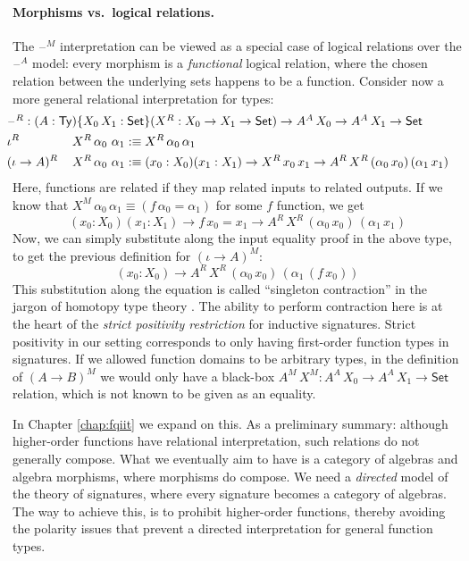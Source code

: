 \documentclass[12pt,a4paper,twoside,openany]{book}
\theoremstyle{remark}
\theoremstyle{definition}
\theoremstyle{theorem}
\newcommand{\Ty}{\mathsf{Ty}}
\newcommand{\blank}{\mathord{\hspace{1pt}\text{--}\hspace{1pt}}}
\newcommand{\Set}{\mathsf{Set}}
\newcommand{\defn}{:\equiv}
\begin{document}
\paragraph{Morphisms vs.\ logical relations.}
The $\blank^M$ interpretation can be viewed as a special case of logical
relations over the $\blank^A$ model: every morphism is a \emph{functional}
logical relation, where the chosen relation between the underlying sets happens
to be a function. Consider now a more general relational interpretation for
types:
\begin{alignat*}{3}
  & \hspace{-0.5em}\rlap{$\blank^R : (A : \Ty)\{X_0\,X_1 : \Set\}(X^R : X_0 \to X_1 \to \Set) \to A^A\,X_0 \to A^A\,X_1 \to \Set$}\\
  & \hspace{-0.5em}\iota^R\,&&X^R\,\alpha_0\,\,\alpha_1 \defn X^R\,\alpha_0\,\alpha_1 \\
  & \hspace{-0.5em}(\iota\to A)^R\,&&X^R\,\alpha_0\,\,\alpha_1 \defn
       (x_0 : X_0)(x_1 : X_1) \to X^R\,x_0\,x_1 \to A^R\,X^R\,(\alpha_0\,x_0)\,(\alpha_1\,x_1)
\end{alignat*}
Here, functions are related if they map related inputs to related outputs. If we
know that $X^M\,\alpha_0\,\alpha_1 \equiv (f\,\alpha_0 = \alpha_1)$ for some $f$
function, we get
\[
  (x_0 : X_0)(x_1 : X_1) \to f\,x_0 = x_1 \to A^R\,X^R\,(\alpha_0\,x_0)\,(\alpha_1\,x_1)
\]
Now, we can simply substitute along the input equality proof in the above type,
to get the previous definition for $(\iota \to A)^M$:
\[
  (x_0 : X_0) \to A^R\,X^R\,(\alpha_0\,x_0)\,(\alpha_1\,(f\,x_0))
\]
This substitution along the equation is called ``singleton contraction'' in the
jargon of homotopy type theory \cite{hottbook}. The ability to perform contraction
here is at the heart of the \emph{strict positivity restriction} for inductive
signatures. Strict positivity in our setting corresponds to only having
first-order function types in signatures. If we allowed function domains to be
arbitrary types, in the definition of $(A \to B)^M$ we would only have a
black-box $A^M\,X^M : A^A\,X_0 \to A^A\,X_1 \to \Set$ relation, which is not
known to be given as an equality.

In Chapter \ref{chap:fqiit} we expand on this. As a preliminary summary:
although higher-order functions have relational interpretation, such relations
do not generally compose. What we eventually aim to have is a category of
algebras and algebra morphisms, where morphisms do compose. We need a
\emph{directed} model of the theory of signatures, where every signature becomes
a category of algebras. The way to achieve this, is to prohibit higher-order
functions, thereby avoiding the polarity issues that prevent a directed
interpretation for general function types.
\end{document}
